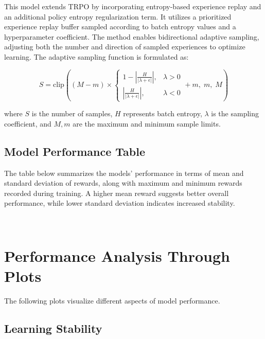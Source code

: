 \documentclass{article}
\begin{document}
This model extends TRPO by incorporating entropy-based experience replay and an additional policy entropy regularization term. It utilizes a prioritized experience replay buffer sampled according to batch entropy values and a hyperparameter coefficient. The method enables bidirectional adaptive sampling, adjusting both the number and direction of sampled experiences to optimize learning. The adaptive sampling function is formulated as:

\begin{equation}
    S = \text{clip} \left( \left( M - m \right) \times 
    \begin{cases}
        1 - \left| \frac{H}{| \lambda + \epsilon |} \right|, & \lambda > 0 \\
        \left| \frac{H}{| \lambda + \epsilon |} \right|, & \lambda < 0
    \end{cases}
    + m, \; m, \; M \right)
\end{equation}

where \( S \) is the number of samples, \( H \) represents batch entropy, \( \lambda \) is the sampling coefficient, and \( M, m \) are the maximum and minimum sample limits.


\subsection*{Model Performance Table}

The table below summarizes the models' performance in terms of mean and standard deviation of rewards, along with maximum and minimum rewards recorded during training. A higher mean reward suggests better overall performance, while lower standard deviation indicates increased stability.

\bigskip

\begin{center}
  
\end{center}
\
\bigskip

\section{Performance Analysis Through Plots}

The following plots visualize different aspects of model performance.

\subsection*{Learning Stability}
\end{document}
